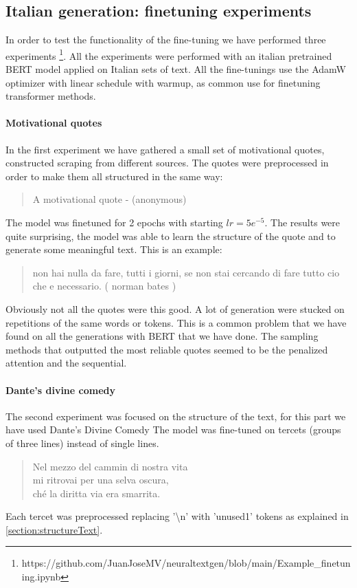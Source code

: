\documentclass[10pt,twocolumn,letterpaper]{article}
\begin{document}
\subsection{Italian generation: finetuning experiments}
In order to test the functionality of the fine-tuning we have performed three experiments
\footnote[1]{https://github.com/JuanJoseMV/neuraltextgen/blob/main/Example\_finetuning.ipynb}.
All the experiments were performed with an italian pretrained BERT model applied on Italian sets of text.
All the fine-tunings use the AdamW optimizer with linear schedule with warmup, as common use for finetuning transformer methods.

\paragraph{Motivational quotes} In the first experiment we have gathered a small set of motivational quotes,
constructed scraping from different sources. The quotes were preprocessed in order to make them
all structured in the same way:
\begin{quote}
   A motivational quote - (anonymous)
\end{quote}

The model was finetuned for 2 epochs with starting $lr=5e^{-5}$. The results were quite surprising,
the model was able to learn the structure of the quote and to generate some meaningful text.
This is an example:

\begin{quote}
non hai nulla da fare, tutti i giorni, se non stai cercando di fare tutto cio che e necessario. ( norman bates )
\end{quote}

Obviously not all the quotes were this good.
A lot of generation were stucked on repetitions of the same words or tokens.
This is a common problem that we have found on all the generations with BERT that we have done.
The sampling methods that outputted the most reliable quotes seemed to be the penalized attention and the sequential.

\paragraph{Dante's divine comedy} The second experiment was focused on the structure of the text,
for this part we have used Dante's Divine Comedy
The model was fine-tuned on tercets (groups of three lines) instead of single lines.
\begin{quote}
   Nel mezzo del cammin di nostra vita\\
   mi ritrovai per una selva oscura,\\
   ché la diritta via era smarrita.\\
\end{quote}
Each tercet was preprocessed replacing '\textbackslash n' with 'unused1' tokens as explained in \ref{section:structureText}.
\end{document}
